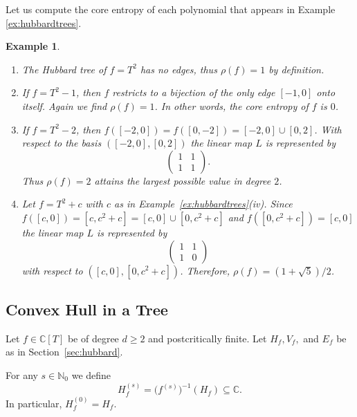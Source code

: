 \documentclass[12pt,oneside,a4]{amsart}
\newcommand{\IC}{\mathbb{C}}
\newcommand{\IN}{\mathbb{N}}
\newcounter{maincounter}
\numberwithin{maincounter}{section}
\numberwithin{equation}{section}
\newtheorem{example}[maincounter]{Example}
\renewcommand{\subset}{\subseteq}
\begin{document}
Let us compute the core entropy of each polynomial that appears in
Example \ref{ex:hubbardtrees}.

\begin{example}
  \label{ex:spectralradius}
  \begin{enumerate}
  \item[(i)] The Hubbard tree of $f = T^2$ has no edges, thus $\rho(f)=1$
    by definition. 
  \item[(ii)] If $f = T^2-1$, then $f$ restricts to a bijection of
    the only edge $[-1,0]$ onto itself. Again we find $\rho(f)=1$.  In other words, the core
    entropy of $f$ is $0$. 
  \item[(iii)] If $f = T^2-2$, then $f([-2,0]) = f([0,-2]) =
    [-2,0]\cup [0,2]$. With respect to the basis $([-2,0],[0,2])$ the
    linear map $L$ is represented by
    \begin{equation*}
      \left(
        \begin{array}{cc}
          1 & 1 \\ 1 & 1
        \end{array}
      \right).
    \end{equation*}
    Thus $\rho(f) = 2$ attains the largest possible value in degree $2$.
  \item[(iv)] Let $f = T^2+c$ with $c$ as in
    Example~\ref{ex:hubbardtrees}(iv).
    Since $f([c,0]) = [c,c^2+c] = [c,0]\cup [0,c^2+c]$ and
    $f([0,c^2+c]) = [c,0]$ the linear map $L$ is represented by
    \begin{equation*}
      \left(
        \begin{array}{cc}
          1 & 1 \\
          1 & 0
        \end{array}
      \right)
    \end{equation*}
    with respect to $([c,0],[0,c^2+c])$. Therefore, $\rho(f) = (1+\sqrt 5)/2$. 
  \end{enumerate}
\end{example}

\subsection{Convex Hull in a Tree}
\label{sec:growth}

Let $f\in \IC[T]$ be of  degree $d \ge 2$ and
postcritically finite. Let $H_f,V_f,$ and $E_f$ be as in
Section~\ref{sec:hubbard}.

For any $s\in\IN_0$ we define
\begin{equation}
  \label{def:hubbardpreimage}
 H_f^{(s)} = \bigl(f^{(s)}\bigr)^{-1}(H_f) \subset\IC.
\end{equation}
In particular, $H_f^{(0)} = H_f$.
\end{document}
